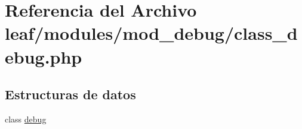 \hypertarget{class__debug_8php}{\section{Referencia del Archivo leaf/modules/mod\-\_\-debug/class\-\_\-debug.php}
\label{class__debug_8php}
}
\subsection*{Estructuras de datos}
\begin{DoxyCompactItemize}
\item 
class \hyperlink{classdebug}{debug}
\end{DoxyCompactItemize}
